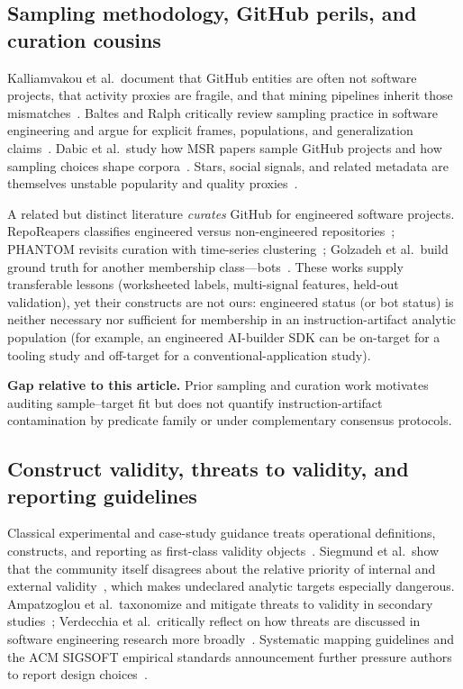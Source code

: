 \subsection{Sampling methodology, GitHub perils, and curation cousins}
\label{subsec:rw-sampling}

Kalliamvakou et al.\ document that GitHub entities are often not software projects, that activity proxies are fragile, and that mining pipelines inherit those mismatches~\cite{kalliamvakou2014perils,kalliamvakou2015indepth}.
Baltes and Ralph critically review sampling practice in software engineering and argue for explicit frames, populations, and generalization claims~\cite{baltes2022sampling}.
Dabic et al.\ study how MSR papers sample GitHub projects and how sampling choices shape corpora~\cite{dabic2021sampling}.
Stars, social signals, and related metadata are themselves unstable popularity and quality proxies~\cite{borges2016popularity,tsay2014influence}.

A related but distinct literature \emph{curates} GitHub for engineered software projects.
RepoReapers classifies engineered versus non-engineered repositories~\cite{munaiah2017curating}; PHANTOM revisits curation with time-series clustering~\cite{phantom2020}; Golzadeh et al.\ build ground truth for another membership class---bots~\cite{golzadeh2021bots}.
These works supply transferable lessons (worksheeted labels, multi-signal features, held-out validation), yet their constructs are not ours: engineered status (or bot status) is neither necessary nor sufficient for membership in an instruction-artifact analytic population (for example, an engineered AI-builder SDK can be on-target for a tooling study and off-target for a conventional-application study).

\textbf{Gap relative to this article.}
Prior sampling and curation work motivates auditing sample--target fit but does not quantify instruction-artifact contamination by predicate family or under complementary consensus protocols.

\subsection{Construct validity, threats to validity, and reporting guidelines}
\label{subsec:rw-validity}

Classical experimental and case-study guidance treats operational definitions, constructs, and reporting as first-class validity objects~\cite{wohlin2012exp,runeson2009case,jedlitschka2005reporting}.
Siegmund et al.\ show that the community itself disagrees about the relative priority of internal and external validity~\cite{siegmund2015views}, which makes undeclared analytic targets especially dangerous.
Ampatzoglou et al.\ taxonomize and mitigate threats to validity in secondary studies~\cite{ampatzoglou2019threats}; Verdecchia et al.\ critically reflect on how threats are discussed in software engineering research more broadly~\cite{verdecchia2023threats}.
Systematic mapping guidelines and the ACM SIGSOFT empirical standards announcement further pressure authors to report design choices~\cite{petersen2015mapping,ralph2021standards}.

